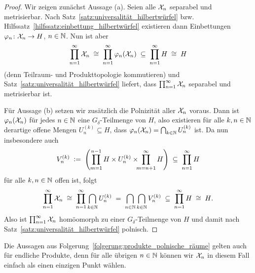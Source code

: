 \documentclass[../thesis/thesis.tex]{subfiles}
\begin{document}
	\begin{proof}
		Wir zeigen zunächst Aussage (a). Seien alle $\mathcal{X}_n$ separabel und metrisierbar. Nach Satz~\ref{satz:universalität_hilbertwürfel} bzw. 
		Hilfssatz~\ref{hilfssatz:einbettung_hilbertwürfel} existieren dann Einbettungen $\varphi_n \colon \mathcal{X}_n \to H$, $n \in \mathbb{N}$. Nun ist aber 
		\[ \prod_{n=1}^{\infty} \mathcal{X}_n \; \cong \; \prod_{n=1}^{\infty} \varphi_n(\mathcal{X}_n) \; \subseteq \; \prod_{n=1}^{\infty} H \; \cong \; H \]
		(denn Teilraum- und Produkttopologie kommutieren) und Satz~\ref{satz:universalität_hilbertwürfel} liefert, dass $\prod_{n=1}^{\infty} \mathcal{X}_n$ separabel und metrisierbar ist.
		
		Für Aussage (b) setzen wir zusätzlich die Polnizität aller $\mathcal{X}_n$ voraus. Dann ist $\varphi_n(\mathcal{X}_n)$ für jedes $n \in \mathbb{N}$ eine $G_{\delta}$-Teilmenge von $H$, also
		existieren für alle $k, n \in \mathbb{N}$ derartige offene Mengen $U_n^{(k)} \subseteq H$, dass $\varphi_n(\mathcal{X}_n) = \bigcap_{k \in \mathbb{N}} U_n^{(k)}$ ist. Da nun insbesondere auch
		\[ V_n^{(k)} \; \vcentcolon = \; \left( \prod_{m=1}^{n-1} H \times U_n^{(k)} \times \!\!\! \prod_{m=n+1}^{\infty} H \right) \; \subseteq \; \prod_{n=1}^{\infty} H \]
		für alle $k, n \in \mathbb{N}$ offen ist, folgt
		\[ \prod_{n=1}^{\infty} \mathcal{X}_n \; \cong \; \prod_{n=1}^{\infty} \bigcap_{k \in \mathbb{N}} U_n^{(k)} \; = \; \bigcap_{n \in \mathbb{N}} \bigcap_{k \in \mathbb{N}} V_n^{(k)} \; \subseteq \; \prod_{n=1}^{\infty} H \; \cong \; H \text{.} \]
		Also ist $\prod_{n=1}^{\infty} \mathcal{X}_n$ homöomorph zu einer $G_{\delta}$-Teilmenge von $H$ und damit nach Satz~\ref{satz:universalität_hilbertwürfel} polnisch.
	\end{proof}
	
	\begin{Bemerkung}
		Die Aussagen aus Folgerung~\ref{folgerung:produkte_polnische_räume} gelten auch für endliche Produkte, denn für alle übrigen $n \in \mathbb{N}$ können wir $\mathcal{X}_n$ in diesem Fall einfach als einen einzigen Punkt wählen.
	\end{Bemerkung}
	
\end{document}
